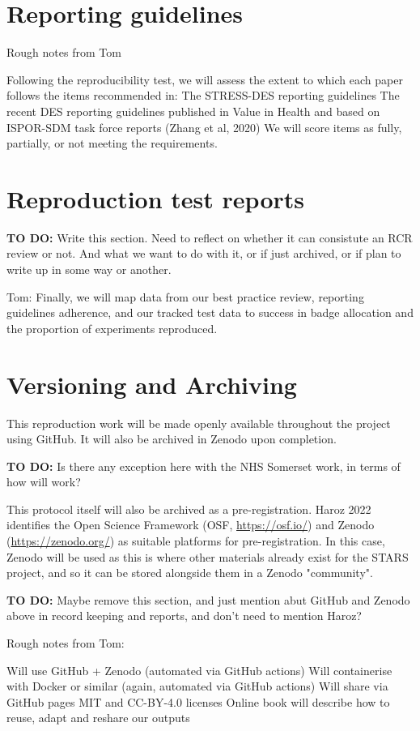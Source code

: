 \section{Reporting guidelines}

Rough notes from Tom

Following the reproducibility test, we will assess the extent to which each paper follows the items recommended in:
The STRESS-DES reporting guidelines
The recent DES reporting guidelines published in Value in Health and based on ISPOR-SDM task force reports (Zhang et al, 2020)
We will score items as fully, partially, or not meeting the requirements.

\section{Reproduction test reports}

\textbf{TO DO:} Write this section. Need to reflect on whether it can consistute an RCR review or not. And what we want to do with it, or if just archived, or if plan to write up in some way or another.

Tom: Finally, we will map data from our best practice review, reporting guidelines adherence, and our tracked test data to success in badge allocation and the proportion of experiments reproduced.

\section{Versioning and Archiving}

This reproduction work will be made openly available throughout the project using GitHub. It will also be archived in Zenodo upon completion.

\textbf{TO DO:} Is there any exception here with the NHS Somerset work, in terms of how will work?

This protocol itself will also be archived as a pre-registration. Haroz 2022 identifies the Open Science Framework (OSF, \url{https://osf.io/}) and Zenodo (\url{https://zenodo.org/}) as suitable platforms for pre-registration.\autocite{haroz_comparison_2022} In this case, Zenodo will be used as this is where other materials already exist for the STARS project, and so it can be stored alongside them in a Zenodo "community".

\textbf{TO DO:} Maybe remove this section, and just mention abut GitHub and Zenodo above in record keeping and reports, and don't need to mention Haroz?

Rough notes from Tom:

Will use GitHub + Zenodo (automated via GitHub actions)
Will containerise with Docker or similar (again, automated via GitHub actions)
Will share via GitHub pages
MIT and CC-BY-4.0 licenses
Online book will describe how to reuse, adapt and reshare our outputs

